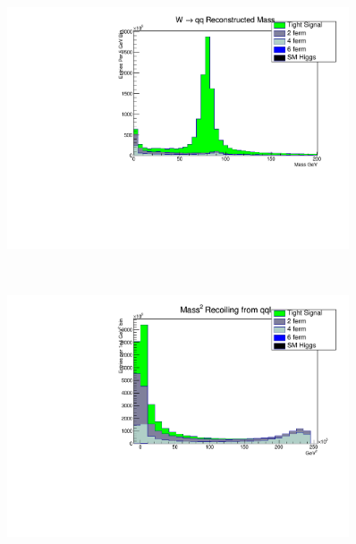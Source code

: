 \begin{figure}
\begin{minipage}{0.49\textwidth}
    \end{minipage}\hfill
    \begin{minipage}{0.49\textwidth}
        \centering
        \includegraphics[width=0.9\textwidth]{mwhadHist.pdf} %
     
     \end{minipage}\\

 \centering
    \begin{minipage}{0.49\textwidth}
        \centering
        \includegraphics[width=0.9\textwidth]{vrecoilHist.pdf} %
       

\end{minipage}
\end{figure}
